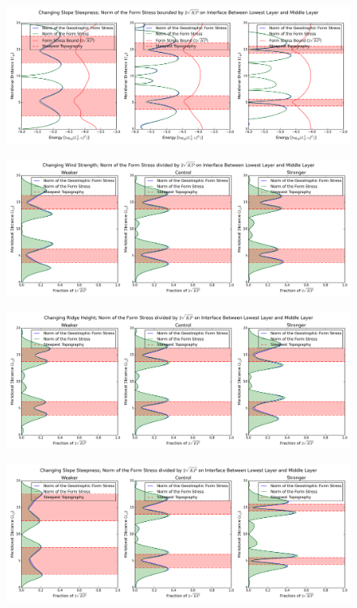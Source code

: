 \documentclass[12pt,a4paper]{report}
\begin{document}
\begin{figure}
	\centering
	\includegraphics[width=\linewidth]{uepebound_2_0}
	\caption{ }
\end{figure}

\begin{figure}
	\centering
	\includegraphics[width=\linewidth]{uformnormoverbound_0_0}
	\caption{ }
\end{figure}

\begin{figure}
	\centering
	\includegraphics[width=\linewidth]{uformnormoverbound_1_0}
	\caption{ }
\end{figure}

\begin{figure}
	\centering
	\includegraphics[width=\linewidth]{uformnormoverbound_2_0}
	\caption{ }
\end{figure}
\end{document}
